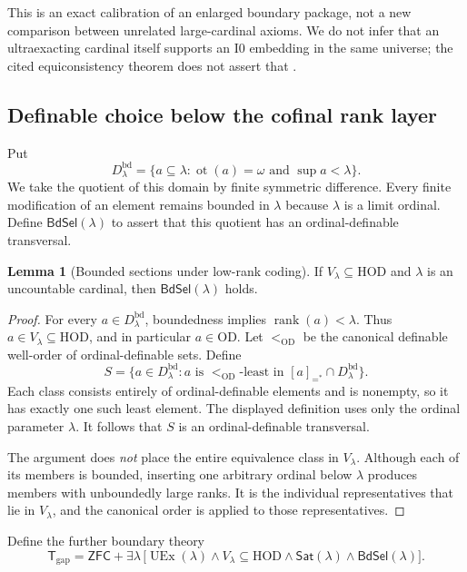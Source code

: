 \documentclass[11pt,letterpaper]{article}
\theoremstyle{definition}
\newtheorem{lemma}[definition]{Lemma}
\newcommand{\ZFC}{\mathsf{ZFC}}
\newcommand{\HOD}{\mathrm{HOD}}
\newcommand{\OD}{\mathrm{OD}}
\newcommand{\UEx}{\operatorname{UEx}}
\newcommand{\ot}{\operatorname{ot}}
\newcommand{\rank}{\operatorname{rank}}
\newcommand{\Izero}{\mathrm{I0}}
\numberwithin{equation}{section}
\newcommand{\Sat}{\mathsf{Sat}}
\newcommand{\bd}{\mathrm{bd}}
\begin{document}
This is an exact calibration of an enlarged boundary package, not a new comparison between unrelated large-cardinal axioms. We do not infer that an ultraexacting cardinal itself supports an $\Izero$ embedding in the same universe; the cited equiconsistency theorem does not assert that \cite[discussion after Theorem~4.5]{abgl}.

\subsection{Definable choice below the cofinal rank layer}

Put
\[
D^{\bd}_\lambda=
\{a\subseteq\lambda:\ot(a)=\omega\text{ and }\sup a<\lambda\}.
\]
We take the quotient of this domain by finite symmetric difference. Every finite modification of an element remains bounded in $\lambda$ because $\lambda$ is a limit ordinal. Define $\mathsf{BdSel}(\lambda)$ to assert that this quotient has an ordinal-definable transversal.

\begin{lemma}[Bounded sections under low-rank coding]\label{lem:bounded}
If $V_\lambda\subseteq\HOD$ and $\lambda$ is an uncountable cardinal, then $\mathsf{BdSel}(\lambda)$ holds.
\end{lemma}
\begin{proof}
For every $a\in D^{\bd}_\lambda$, boundedness implies $\rank(a)<\lambda$. Thus $a\in V_\lambda\subseteq\HOD$, and in particular $a\in\OD$. Let $<_{\OD}$ be the canonical definable well-order of ordinal-definable sets. Define
\[
S=\{a\in D^{\bd}_\lambda:
  a\text{ is }<_{\OD}\text{-least in }[a]_{=^{*}}\cap D^{\bd}_\lambda\}.
\]
Each class consists entirely of ordinal-definable elements and is nonempty, so it has exactly one such least element. The displayed definition uses only the ordinal parameter $\lambda$. It follows that $S$ is an ordinal-definable transversal.

The argument does \emph{not} place the entire equivalence class in $V_\lambda$. Although each of its members is bounded, inserting one arbitrary ordinal below $\lambda$ produces members with unboundedly large ranks. It is the individual representatives that lie in $V_\lambda$, and the canonical order is applied to those representatives.
\end{proof}

Define the further boundary theory
\[
\mathsf T_{\mathrm{gap}}=\ZFC+\exists\lambda\,
\bigl[\UEx(\lambda)\wedge V_\lambda\subseteq\HOD
\wedge\Sat(\lambda)\wedge\mathsf{BdSel}(\lambda)\bigr].
\]
\end{document}
